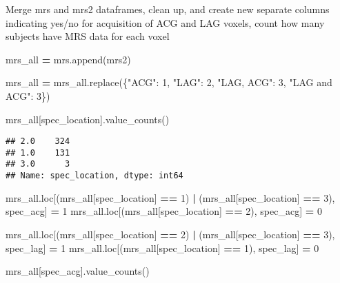 \documentclass[
]{article}
\newenvironment{Shaded}{\begin{snugshade}}{\end{snugshade}}
\newcommand{\DecValTok}[1]{\textcolor[rgb]{0.00,0.00,0.81}{#1}}
\newcommand{\NormalTok}[1]{#1}
\newcommand{\OperatorTok}[1]{\textcolor[rgb]{0.81,0.36,0.00}{\textbf{#1}}}
\newcommand{\StringTok}[1]{\textcolor[rgb]{0.31,0.60,0.02}{#1}}
\begin{document}
Merge mrs and mrs2 dataframes, clean up, and create new separate columns
indicating yes/no for acquisition of ACG and LAG voxels, count how many
subjects have MRS data for each voxel

\begin{Shaded}
\begin{Highlighting}[]
\NormalTok{mrs\_all }\OperatorTok{=}\NormalTok{ mrs.append(mrs2)}

\NormalTok{mrs\_all }\OperatorTok{=}\NormalTok{ mrs\_all.replace(\{}\StringTok{"ACG"}\NormalTok{: }\DecValTok{1}\NormalTok{, }\StringTok{"LAG"}\NormalTok{: }\DecValTok{2}\NormalTok{, }\StringTok{"LAG, ACG"}\NormalTok{: }\DecValTok{3}\NormalTok{, }\StringTok{"LAG and ACG"}\NormalTok{: }\DecValTok{3}\NormalTok{\})}

\NormalTok{mrs\_all[}\StringTok{\textquotesingle{}spec\_location\textquotesingle{}}\NormalTok{].value\_counts()}
\end{Highlighting}
\end{Shaded}

\begin{verbatim}
## 2.0    324
## 1.0    131
## 3.0      3
## Name: spec_location, dtype: int64
\end{verbatim}

\begin{Shaded}
\begin{Highlighting}[]
\NormalTok{mrs\_all.loc[(mrs\_all[}\StringTok{\textquotesingle{}spec\_location\textquotesingle{}}\NormalTok{] }\OperatorTok{==} \DecValTok{1}\NormalTok{) }\OperatorTok{|}\NormalTok{ (mrs\_all[}\StringTok{\textquotesingle{}spec\_location\textquotesingle{}}\NormalTok{] }\OperatorTok{==} \DecValTok{3}\NormalTok{), }\StringTok{\textquotesingle{}spec\_acg\textquotesingle{}}\NormalTok{] }\OperatorTok{=} \DecValTok{1}
\NormalTok{mrs\_all.loc[(mrs\_all[}\StringTok{\textquotesingle{}spec\_location\textquotesingle{}}\NormalTok{] }\OperatorTok{==} \DecValTok{2}\NormalTok{), }\StringTok{\textquotesingle{}spec\_acg\textquotesingle{}}\NormalTok{] }\OperatorTok{=} \DecValTok{0}

\NormalTok{mrs\_all.loc[(mrs\_all[}\StringTok{\textquotesingle{}spec\_location\textquotesingle{}}\NormalTok{] }\OperatorTok{==} \DecValTok{2}\NormalTok{) }\OperatorTok{|}\NormalTok{ (mrs\_all[}\StringTok{\textquotesingle{}spec\_location\textquotesingle{}}\NormalTok{] }\OperatorTok{==} \DecValTok{3}\NormalTok{), }\StringTok{\textquotesingle{}spec\_lag\textquotesingle{}}\NormalTok{] }\OperatorTok{=} \DecValTok{1}
\NormalTok{mrs\_all.loc[(mrs\_all[}\StringTok{\textquotesingle{}spec\_location\textquotesingle{}}\NormalTok{] }\OperatorTok{==} \DecValTok{1}\NormalTok{), }\StringTok{\textquotesingle{}spec\_lag\textquotesingle{}}\NormalTok{] }\OperatorTok{=} \DecValTok{0}

\NormalTok{mrs\_all[}\StringTok{\textquotesingle{}spec\_acg\textquotesingle{}}\NormalTok{].value\_counts()}
\end{Highlighting}
\end{Shaded}
\end{document}
